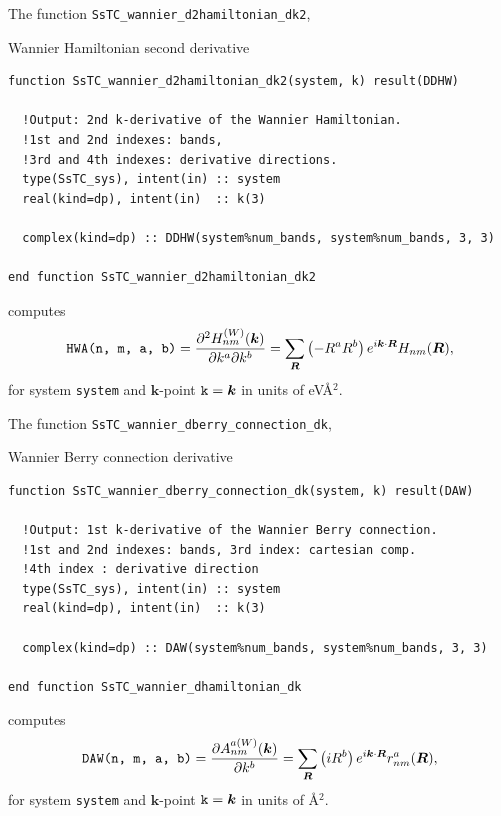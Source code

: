 \documentclass[10pt,a4paper]{article}
\begin{document}
The function \verb|SsTC_wannier_d2hamiltonian_dk2|,
\begin{codebox}{Wannier Hamiltonian second derivative}
\begin{lstlisting}[caption={Interface of ``Wannier Hamiltonian's 2nd derivative".},captionpos=b]
function SsTC_wannier_d2hamiltonian_dk2(system, k) result(DDHW)

  !Output: 2nd k-derivative of the Wannier Hamiltonian.
  !1st and 2nd indexes: bands,
  !3rd and 4th indexes: derivative directions.
  type(SsTC_sys), intent(in) :: system
  real(kind=dp), intent(in)  :: k(3)

  complex(kind=dp) :: DDHW(system%num_bands, system%num_bands, 3, 3)

end function SsTC_wannier_d2hamiltonian_dk2
\end{lstlisting}
\end{codebox}
computes
\begin{equation}
\verb|HWA(n, m, a, b)| = \frac{\partial^2 H_{nm}^{(W)}(\bm{k})}{\partial k^a \partial k^b} = \sum_{\bm{R}}\left(-R^aR^b \right) e^{i\bm{k}\cdot\bm{R}} H_{nm}(\bm{R}),
\end{equation}
for system \verb|system| and $\bm{k}$-point $\verb|k| = \bm{k}$ in units of eV\r{A}$^2$.

The function \verb|SsTC_wannier_dberry_connection_dk|,
\begin{codebox}{Wannier Berry connection derivative}
\begin{lstlisting}[caption={Interface of ``Wannier Berry connection's derivative".},captionpos=b]
function SsTC_wannier_dberry_connection_dk(system, k) result(DAW)

  !Output: 1st k-derivative of the Wannier Berry connection.
  !1st and 2nd indexes: bands, 3rd index: cartesian comp.
  !4th index : derivative direction
  type(SsTC_sys), intent(in) :: system
  real(kind=dp), intent(in)  :: k(3)

  complex(kind=dp) :: DAW(system%num_bands, system%num_bands, 3, 3)

end function SsTC_wannier_dhamiltonian_dk
\end{lstlisting}
\end{codebox}
computes
\begin{equation}
\verb|DAW(n, m, a, b)| = \frac{\partial A_{nm}^{a(W)}(\bm{k})}{\partial k^b} = \sum_{\bm{R}}\left(iR^b \right) e^{i\bm{k}\cdot\bm{R}} r^a_{nm}(\bm{R}),
\end{equation}
for system \verb|system| and $\bm{k}$-point $\verb|k| = \bm{k}$ in units of \r{A}$^2$.
\end{document}
